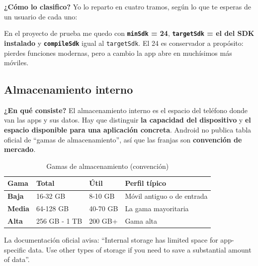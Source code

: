 \documentclass[11pt,a4paper]{article}
\newcommand{\code}[1]{\texttt{\color{ink}#1}}
\newcommand{\campo}[1]{\textbf{\color{ink}#1}}
\begin{document}
	\campo{¿Cómo lo clasifico?}
	Yo lo reparto en cuatro tramos, según lo que te esperas de un usuario de cada uno:
	
	En el proyecto de prueba me quedo con \textbf{\code{minSdk} = 24}, \textbf{\code{targetSdk} = el del SDK instalado} y \textbf{\code{compileSdk}} igual al \code{targetSdk}. El 24 es conservador a propósito: pierdes funciones modernas, pero a cambio la app abre en muchísimos más móviles.
	
	\subsection{Almacenamiento interno}
	
	\campo{¿En qué consiste?}
	El almacenamiento interno es el espacio del teléfono donde van las apps y sus datos. Hay que distinguir \textbf{la capacidad del dispositivo} y \textbf{el espacio disponible para una aplicación concreta}. Android no publica tabla oficial de \enquote{gamas de almacenamiento}, así que las franjas son \textbf{convención de mercado}.
	
	\begin{table}[htbp]
		\centering
		\small
		\begin{tabularx}{\textwidth}{@{}l l l >{\RaggedRight\arraybackslash}X@{}}
			\toprule
			\rowcolor{primary}
			\textcolor{paper}{\sffamily\bfseries Gama} & \textcolor{paper}{\sffamily\bfseries Total} & \textcolor{paper}{\sffamily\bfseries Útil} & \textcolor{paper}{\sffamily\bfseries Perfil típico} \\
			\midrule
			\textbf{Baja} & 16-32 GB & 8-10 GB & Móvil antiguo o de entrada \\
			\rowcolor{soft}
			\textbf{Media} & 64-128 GB & 40-70 GB & La gama mayoritaria \\
			\textbf{Alta} & 256 GB - 1 TB & 200 GB+ & Gama alta \\
			\bottomrule
		\end{tabularx}
		\caption{Gamas de almacenamiento (convención)}
	\end{table}
	
	La documentación oficial avisa: \enquote{Internal storage has limited space for app-specific data. Use other types of storage if you need to save a substantial amount of data}.
	
\end{document}
